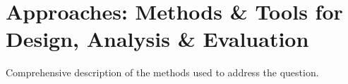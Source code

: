 \section{Approaches: Methods \& Tools for Design, Analysis \& Evaluation}

Comprehensive description of the methods used to address the question.